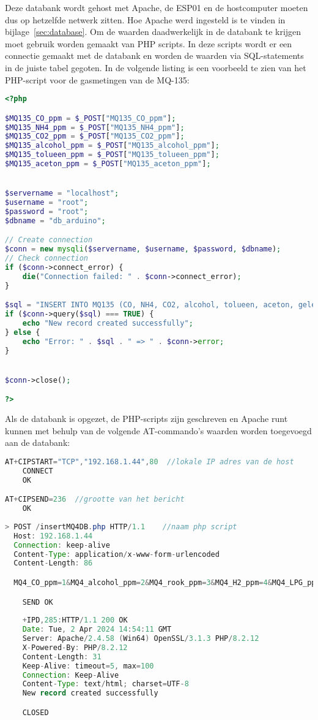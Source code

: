 Deze databank wordt gehost met Apache, de ESP01 en de hostcomputer moeten dus op hetzelfde netwerk zitten. Hoe Apache werd ingesteld is te vinden in bijlage~\ref{sec:database}. Om de waarden daadwerkelijk in de databank te krijgen moet gebruik worden gemaakt van PHP scripts. In deze scripts wordt er een connectie gemaakt met de databank en worden de waarden via SQL-statements in de juiste tabel gegoten. In de volgende listing is een voorbeeld te zien van het PHP-script voor de gasmetingen van de MQ-135:
\begin{lstlisting}[language=PHP,caption={PHP-script MQ-135}]
<?php

$MQ135_CO_ppm = $_POST["MQ135_CO_ppm"];
$MQ135_NH4_ppm = $_POST["MQ135_NH4_ppm"];
$MQ135_CO2_ppm = $_POST["MQ135_CO2_ppm"];
$MQ135_alcohol_ppm = $_POST["MQ135_alcohol_ppm"];
$MQ135_tolueen_ppm = $_POST["MQ135_tolueen_ppm"];
$MQ135_aceton_ppm = $_POST["MQ135_aceton_ppm"];


$servername = "localhost";
$username = "root";
$password = "root";
$dbname = "db_arduino";

// Create connection
$conn = new mysqli($servername, $username, $password, $dbname);
// Check connection
if ($conn->connect_error) {
    die("Connection failed: " . $conn->connect_error);
}

$sql = "INSERT INTO MQ135 (CO, NH4, CO2, alcohol, tolueen, aceton, gelezen_op) VALUES ($MQ135_CO_ppm, $MQ135_NH4_ppm, $MQ135_CO2_ppm, $MQ135_alcohol_ppm, $MQ135_tolueen_ppm, $MQ135_aceton_ppm, NOW())";
if ($conn->query($sql) === TRUE) {
    echo "New record created successfully";
} else {
    echo "Error: " . $sql . " => " . $conn->error;
}


$conn->close();

?>

\end{lstlisting}

Als de databank is opgezet, de PHP-scripts zijn geschreven en Apache runt kunnen met behulp van de volgende AT-commando's waarden worden toegevoegd aan de databank:
\begin{lstlisting}[language=Java,caption={ESP01 naar de database}]
AT+CIPSTART="TCP","192.168.1.44",80  //lokale IP adres van de host
    CONNECT
    OK

AT+CIPSEND=236  //grootte van het bericht
    OK
    
> POST /insertMQ4DB.php HTTP/1.1    //naam php script
  Host: 192.168.1.44
  Connection: keep-alive
  Content-Type: application/x-www-form-urlencoded
  Content-Length: 86

  MQ4_CO_ppm=1&MQ4_alcohol_ppm=2&MQ4_rook_ppm=3&MQ4_H2_ppm=4&MQ4_LPG_ppm=5&MQ4_CH4_ppm=6

    SEND OK
    
    +IPD,285:HTTP/1.1 200 OK
    Date: Tue, 2 Apr 2024 14:54:11 GMT
    Server: Apache/2.4.58 (Win64) OpenSSL/3.1.3 PHP/8.2.12
    X-Powered-By: PHP/8.2.12
    Content-Length: 31
    Keep-Alive: timeout=5, max=100
    Connection: Keep-Alive
    Content-Type: text/html; charset=UTF-8
    New record created successfully

    CLOSED
    
\end{lstlisting}


